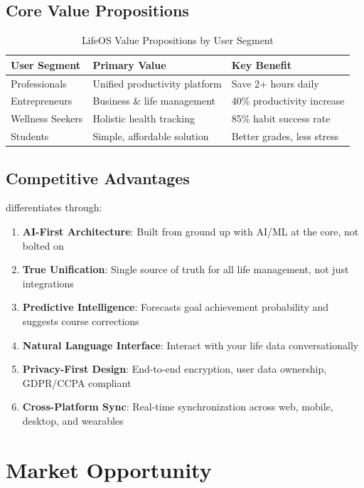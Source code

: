 \subsection{Core Value Propositions}

\begin{table}[H]
\centering
\caption{LifeOS Value Propositions by User Segment}
\begin{tabular}{|p{3cm}|p{5cm}|p{5cm}|}
\hline
\rowcolor{lightgray}
\textbf{User Segment} & \textbf{Primary Value} & \textbf{Key Benefit} \\
\hline
Professionals & Unified productivity platform & Save 2+ hours daily \\
\hline
Entrepreneurs & Business \& life management & 40\% productivity increase \\
\hline
Wellness Seekers & Holistic health tracking & 85\% habit success rate \\
\hline
Students & Simple, affordable solution & Better grades, less stress \\
\hline
\end{tabular}
\end{table}

\subsection{Competitive Advantages}

\lifeos{} differentiates through:

\begin{enumerate}
    \item \textbf{AI-First Architecture}: Built from ground up with AI/ML at the core, not bolted on
    \item \textbf{True Unification}: Single source of truth for all life management, not just integrations
    \item \textbf{Predictive Intelligence}: Forecasts goal achievement probability and suggests course corrections
    \item \textbf{Natural Language Interface}: Interact with your life data conversationally
    \item \textbf{Privacy-First Design}: End-to-end encryption, user data ownership, GDPR/CCPA compliant
    \item \textbf{Cross-Platform Sync}: Real-time synchronization across web, mobile, desktop, and wearables
\end{enumerate}

\section{Market Opportunity}

